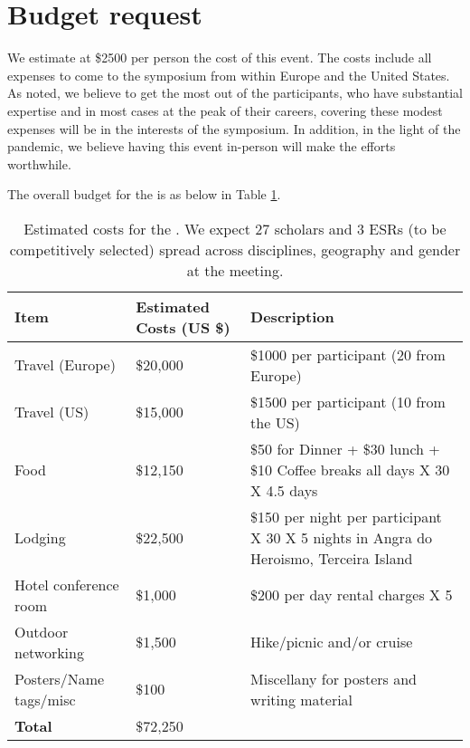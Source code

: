 \section{Budget request}

We estimate at \$2500 per person the cost of this event. The costs
include all expenses to come to the symposium from within Europe and the
United States. As noted, we believe to get the most out of the
participants, who have substantial expertise and in most cases at the
peak of their careers, covering these modest expenses will be in the
interests of the symposium. In addition, in the light of the pandemic,
we believe having this event in-person will make the efforts worthwhile.

The overall budget for the \symp is as below in Table
\ref{tab:budget}. 

\begin{table}[!h]
  \footnotesize{
    \centering    
    \begin{tabular}{|p{3.5cm}|p{1.6cm}|p{10cm}|}
    \hline 
    \rowcolor{Gray}
    \bfseries Item& \bfseries Estimated Costs (US \$)&\bfseries Description\\
    \hline
      Travel (Europe)& \$20,000 & \$1000 per participant (20 from Europe) \\
    \hline
      Travel (US)& \$15,000 & \$1500 per participant (10 from the US) \\
    \hline
      Food& \$12,150 & \$50 for Dinner + \$30 lunch + \$10 Coffee
                       breaks all days X 30 X 4.5 days\\
    \hline
      Lodging& \$22,500 & \$150 per night per participant X 30 X 5 nights in Angra do Heroismo, Terceira Island\\
    \hline
      Hotel conference room &\$1,000 & \$200 per day rental charges X 5\\
    \hline
      Outdoor networking& \$1,500 & Hike/picnic and/or cruise\\
    \hline
      Posters/Name tags/misc& \$100 & Miscellany for posters and writing material\\
    \hline
    \textbf{Total}& \$72,250 &\\
    \hline        
  \end{tabular}
  \caption{Estimated costs for the \sympe. We expect 27 scholars and 3
    ESRs (to be competitively selected) spread across disciplines,
    geography and gender at the meeting.}
  \label{tab:budget}
}
\end{table}


